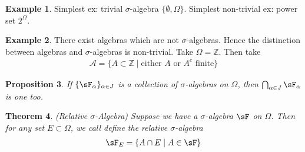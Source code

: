 \documentclass[12pt]{article}
\theoremstyle{plain}
\newtheorem{thm}{Theorem}[section]
\newtheorem{prop}[thm]{Proposition}
\theoremstyle{definition}
\newtheorem{ex}[thm]{Example}
\theoremstyle{remark}
\begin{document}
\begin{ex}
Simplest ex: trivial $\sigma$-algebra $\{\emptyset, \Omega\}$.
Simplest non-trivial ex: power set $2^\Omega$.
\end{ex}

\begin{ex}
There exist algebras which are not $\sigma$-algebras.
Hence the distinction between algebras and $\sigma$-algebras is
non-trivial.
Take $\Omega=\mathbb{Z}$. Then take
\begin{align*}
  \mathscr{A}
  = \{A\subset \mathbb{Z} \; |\; \text{either $A$ or $A^c$ finite}\}
\end{align*}
\end{ex}

\begin{prop}
\label{prop:sigma-intersection}
If $\{\sF_\alpha\}_{\alpha\in J}$ is a collection of
$\sigma$-algebras on $\Omega$, then $\bigcap_{\alpha\in J} \sF_\alpha$
is one too.
\end{prop}


\begin{thm}\emph{(Relative $\sigma$-Algebra)}
\label{thm:relsigal}
Suppose we have a $\sigma$-algebra $\sF$ on $\Omega$. Then for any set
$E\subset \Omega$, we call define the
\emph{relative $\sigma$-algebra}
\begin{align*}
  \sF_E = \{ A \cap E \; | \; A \in \sF\}
\end{align*}
\end{thm}
\end{document}
